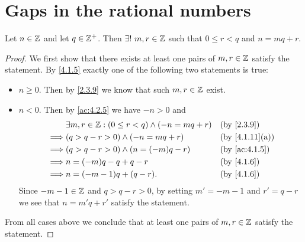\section{Gaps in the rational numbers}\label{sec:4.4}

\begin{ac}\label{ac:4.4.1}
  Let \(n \in \mathbb{Z}\) and let \(q \in \mathbb{Z}^+\).
  Then \(\exists!\ m, r \in \mathbb{Z}\) such that \(0 \leq r < q\) and \(n = mq + r\).
\end{ac}

\begin{proof}
  We first show that there exists at least one pairs of \(m, r \in \mathbb{Z}\) satisfy the statement.
  By \cref{4.1.5} exactly one of the following two statements is true:
  \begin{itemize}
    \item \(n \geq 0\).
          Then by \cref{2.3.9} we know that such \(m, r \in \mathbb{Z}\) exist.
    \item \(n < 0\).
          Then by \cref{ac:4.2.5} we have \(-n > 0\) and
          \begin{align*}
                     & \exists m, r \in \Z : (0 \leq r < q) \land (-n = mq + r) &  & \by{2.3.9}                   \\
            \implies & (q > q - r > 0) \land (-n = mq + r)                      &  & \text{(by \cref{4.1.11}(a))} \\
            \implies & (q > q - r > 0) \land (n = (-m)q - r)                    &  & \by{ac:4.1.5}                \\
            \implies & n = (-m)q - q + q - r                                    &  & \by{4.1.6}                   \\
            \implies & n = (-m - 1)q + (q - r).                                 &  & \by{4.1.6}
          \end{align*}
          Since \(-m - 1 \in \mathbb{Z}\) and \(q > q - r > 0\), by setting \(m' = -m - 1\) and \(r' = q - r\) we see that \(n = m'q + r'\) satisfy the statement.
  \end{itemize}
  From all cases above we conclude that at least one pairs of \(m, r \in \mathbb{Z}\) satisfy the statement.


\end{proof}
